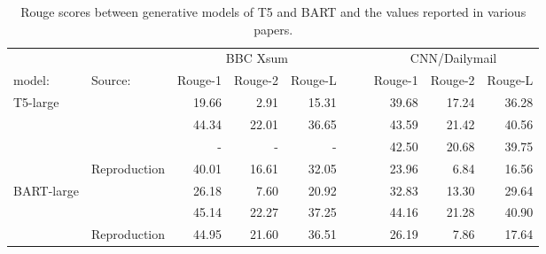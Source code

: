 \begin{table}[!htbp]
\small
\begin{tabular}{llrrrllrrr}
        & & \multicolumn{3}{c}{BBC Xsum} &  &  & \multicolumn{3}{c}{CNN/Dailymail} \\
model:  & Source: & Rouge-1 & Rouge-2 & Rouge-L &  &  & Rouge-1 & Rouge-2 & Rouge-L \\
\hline
T5-large &\cite{zhu2021leveraging} & 19.66 &  2.91 & 15.31 & & & 39.68 & 17.24 & 36.28 \\
         &\cite{rothe2021} & 44.34 & 22.01 & 36.65 &  &  & 43.59 & 21.42 & 40.56 \\
           &\cite{raffel2020} & - & - & - & &  & 42.50 & 20.68 & 39.75 \\
           & Reproduction & 40.01 & 16.61 & 32.05 &  &  & 23.96 & 6.84 & 16.56 \\
\hline
           
BART-large &\cite{zhu2021leveraging} & 26.18 &  7.60  & 20.92 &  &  & 32.83 & 13.30 & 29.64 \\
           &\cite{lewis2019bart} & 45.14 & 22.27 & 37.25 &  &  & 44.16 & 21.28 & 40.90 \\
           & Reproduction & 44.95 & 21.60 & 36.51 &  &  & 26.19 & 7.86  & 17.64                      
\end{tabular}
\caption{Rouge scores between generative models of T5 and BART and the values reported in various papers.}
\label{tab:feasability_results}
\end{table}